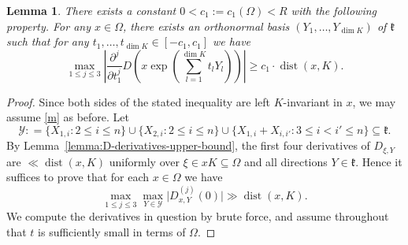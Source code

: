 \documentclass[11pt,oneside]{amsart}
\numberwithin{equation}{section}
\theoremstyle{remark}
\theoremstyle{plain}
\newtheorem{lemma}{Lemma}
\DeclareMathOperator{\dist}{dist}
\newcommand{\mcY}{\mathcal{Y}}
\newcommand\mfk{\mathfrak{k}}
\renewcommand\leq{\leqslant}
\renewcommand\geq{\geqslant}
\begin{document}
\begin{lemma}\label{lemma:D-derivatives}
There exists a constant $0<c_1:=c_1(\Omega)<R$ 
with the following property. For any $x\in\Omega$, 
there exists an orthonormal basis $(Y_1,\dotsc,Y_{\dim K})$ of $\mfk$ such that for any $t_1,\dotsc,t_{\dim K}\in [-c_1,c_1]$ we have 
\[
\max_{1\leq j\leq 3}\left| \frac{\partial^j}{\partial t_1^j} D\left(x \exp\left(\sum_{l=1}^{\dim K} t_l Y_l\right) \right) \right|\geq c_1 \cdot \dist(x,K).
\]
\end{lemma}
\begin{proof} 
Since both sides of the stated inequality are left $K$-invariant in $x$, we may assume \eqref{m} as before.
Let 
$$\mcY: = \{X_{1,i} : 2 \leq i \leq n\} \cup \{X_{2,i} : 2 \leq i \leq n\} \cup \{X_{1,i} + X_{i,i'} : 3\leq i < i' \leq n\} \subseteq \mfk.$$
By Lemma~\ref{lemma:D-derivatives-upper-bound}, the first four derivatives of $D_{\xi,Y}$ are $\ll\dist(x,K)$ uniformly over $\xi\in xK \subseteq \Omega$ and all directions $Y\in\mfk$. Hence it suffices to prove that
for each $x \in \Omega$ we have
\begin{equation}\label{eq:D-derivatives}
\max_{1 \leq j \leq 3} \max_{Y \in \mcY} \bigl| D_{x,Y}^{(j)}(0) \bigr|
\gg\dist(x, K).
\end{equation}
We compute the derivatives in question by brute force, and assume throughout that $t$ is sufficiently small in terms of $\Omega$.


\end{proof}
\end{document}
